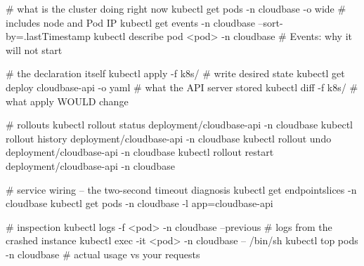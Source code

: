 \begin{cheatsheet}
\end{cheatsheet}

\begin{bashbox}
# what is the cluster doing right now
kubectl get pods -n cloudbase -o wide          # includes node and Pod IP
kubectl get events -n cloudbase --sort-by=.lastTimestamp
kubectl describe pod <pod> -n cloudbase        # Events: why it will not start

# the declaration itself
kubectl apply -f k8s/                          # write desired state
kubectl get deploy cloudbase-api -o yaml       # what the API server stored
kubectl diff -f k8s/                           # what apply WOULD change

# rollouts
kubectl rollout status deployment/cloudbase-api -n cloudbase
kubectl rollout history deployment/cloudbase-api -n cloudbase
kubectl rollout undo deployment/cloudbase-api -n cloudbase
kubectl rollout restart deployment/cloudbase-api -n cloudbase

# service wiring -- the two-second timeout diagnosis
kubectl get endpointslices -n cloudbase
kubectl get pods -n cloudbase -l app=cloudbase-api

# inspection
kubectl logs -f <pod> -n cloudbase --previous  # logs from the crashed instance
kubectl exec -it <pod> -n cloudbase -- /bin/sh
kubectl top pods -n cloudbase                  # actual usage vs your requests
\end{bashbox}

